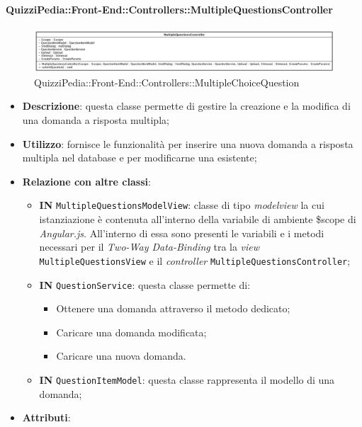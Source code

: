 \paragraph{QuizziPedia::Front-End::Controllers::MultipleQuestionsController}
\begin{figure} [ht]
	\centering
	\includegraphics[scale=0.30]{UML/Classi/Front-End/QuizziPedia_Front-end_Controller_MultipleQuestionsController.png}
	\caption{QuizziPedia::Front-End::Controllers::MultipleChoiceQuestion}
\end{figure} \FloatBarrier
\begin{itemize}
	\item \textbf{Descrizione}: questa classe permette di gestire la creazione e la modifica di una domanda a risposta multipla;
	\item \textbf{Utilizzo}: fornisce le funzionalità per inserire una nuova domanda a risposta multipla nel database e per modificarne una esistente;
	\item \textbf{Relazione con altre classi}:
	\begin{itemize}
		\item \textbf{IN} \texttt{MultipleQuestionsModelView}: classe di tipo \textit{modelview} la cui istanziazione è contenuta all'interno della variabile di ambiente \$scope di \textit{Angular.js}. All'interno di essa sono presenti le variabili e i metodi necessari per il \textit{Two-Way Data-Binding} tra la \textit{view} \texttt{MultipleQuestionsView} e il \textit{controller} \texttt{MultipleQuestionsController};
		\item \textbf{IN} \texttt{QuestionService}: questa classe permette di:
		\begin{itemize}
			\item Ottenere una domanda attraverso il metodo dedicato;
			\item Caricare una domanda modificata;
			\item Caricare una nuova domanda.
		\end{itemize}
		\item \textbf{IN} \texttt{QuestionItemModel}: questa classe rappresenta il modello di una domanda;
	\end{itemize}
	\item \textbf{Attributi}:
	\begin{itemize}

\end{itemize}
\end{itemize}
